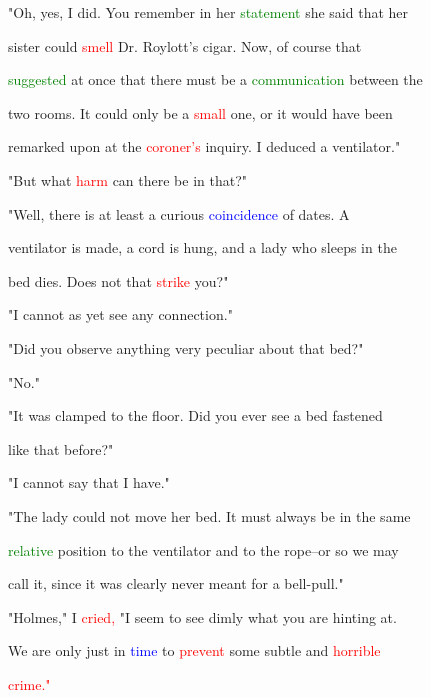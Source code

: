  "Oh, yes, I did. You remember in her \textcolor{green}{statement} she said that her

 sister could \textcolor{red}{smell} Dr. Roylott's cigar. Now, of course that

 \textcolor{green}{suggested} at once that there must be a \textcolor{green}{communication} between the

 two rooms. It could only be a \textcolor{red}{small} one, or it would have been

 remarked upon at the \textcolor{red}{coroner's} \textcolor{BurntOrange}{inquiry.} I deduced a ventilator."



 "But what \textcolor{red}{harm} can there be in that?"



 "Well, there is at least a curious \textcolor{blue}{coincidence} of dates. A

 ventilator is made, a cord is hung, and a lady who sleeps in the

 bed dies. Does not that \textcolor{red}{strike} you?"



 "I cannot as yet see any connection."



 "Did you observe anything very peculiar about that bed?"



 "No."



 "It was clamped to the floor. Did you ever see a bed fastened

 like that before?"



 "I cannot say that I have."



 "The lady could not move her bed. It must always be in the same

 \textcolor{green}{relative} position to the ventilator and to the rope--or so we may

 call it, since it was clearly never meant for a bell-pull."



 "Holmes," I \textcolor{red}{cried,} "I seem to see dimly what you are hinting at.

 We are only just in \textcolor{blue}{time} to \textcolor{red}{prevent} some subtle and \textcolor{red}{horrible}

 \textcolor{red}{crime."}



